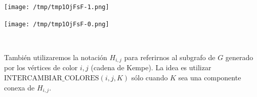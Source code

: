 \documentclass[10pt,a4paper]{article}
\begin{document}
\begin{center}

    \begin{adjustbox}{max size={\textwidth}{\textheight}}
        \texttt{[image: /tmp/tmp1OjFsF-1.png]}
        \end{adjustbox}
    
    \begin{adjustbox}{max size={\textwidth}{\textheight}}
        \texttt{[image: /tmp/tmp1OjFsF-0.png]}
        \end{adjustbox}
    
\end{center}

\begin{center}
 
\end{center}

También utilizaremos la notación $H_{i, j}$ para referirnos al subgrafo de $G$ generado por los vértices de color $i, j$ (cadena de Kempe). La idea es utilizar $\text{INTERCAMBIAR_COLORES}(i, j, K)$ sólo cuando $K$ sea una componente conexa de $H_{i,j}$.

 
\end{document}
